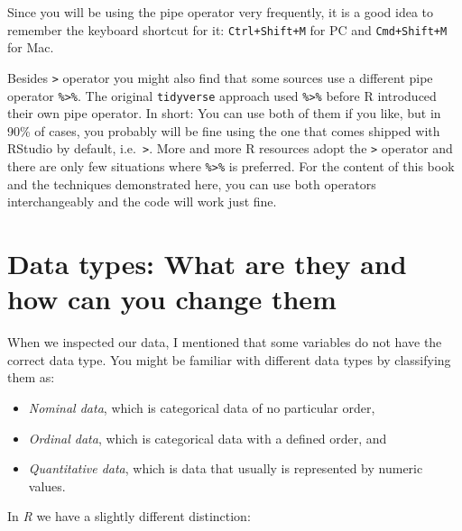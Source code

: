 \documentclass[
  letterpaper,
]{krantz}
\begin{document}
Since you will be using the pipe operator very frequently, it is a good
idea to remember the keyboard shortcut for it: \texttt{Ctrl+Shift+M} for
PC and \texttt{Cmd+Shift+M} for Mac.

Besides \texttt{\textbar{}\textgreater{}} operator you might also find
that some sources use a different pipe operator
\texttt{\%\textgreater{}\%}. The original \texttt{tidyverse} approach
used \texttt{\%\textgreater{}\%} before R introduced their own pipe
operator. In short: You can use both of them if you like, but in 90\% of
cases, you probably will be fine using the one that comes shipped with
RStudio by default, i.e.~\texttt{\textbar{}\textgreater{}}. More and
more R resources adopt the \texttt{\textbar{}\textgreater{}} operator
and there are only few situations where \texttt{\%\textgreater{}\%} is
preferred. For the content of this book and the techniques demonstrated
here, you can use both operators interchangeably and the code will work
just fine.

\section{Data types: What are they and how can you change
them}\label{sec-change-data-types}

When we inspected our data, I mentioned that some variables do not have
the correct data type. You might be familiar with different data types
by classifying them as:

\begin{itemize}
\item
  \emph{Nominal data}, which is categorical data of no particular order,
\item
  \emph{Ordinal data}, which is categorical data with a defined order,
  and
\item
  \emph{Quantitative data}, which is data that usually is represented by
  numeric values.
\end{itemize}

In \emph{R} we have a slightly different distinction:
\end{document}
